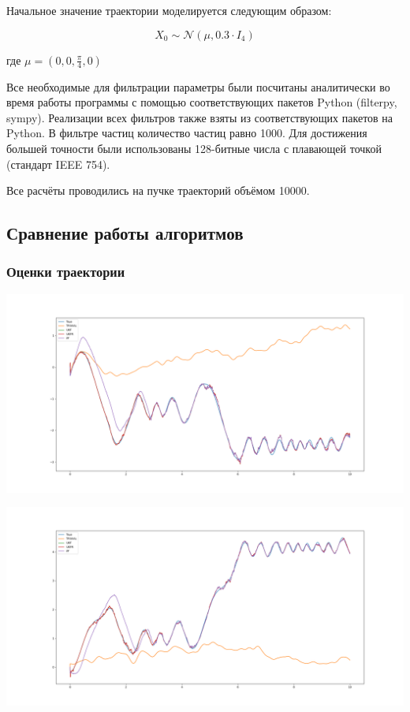 \documentclass[12pt]{article}
\begin{document}
Начальное значение траектории моделируется следующим образом:

\[
	X_0 \sim \mathcal{N}(\mu, 0.3 \cdot I_4)
\]

где $\mu = (0, 0, \frac{\pi}{4}, 0)$

Все необходимые для фильтрации параметры были посчитаны аналитически во время работы программы с помощью соответствующих пакетов Python (filterpy, sympy). Реализации всех фильтров также взяты из соответствующих пакетов на Python. В фильтре частиц количество частиц равно 1000. Для достижения большей точности были использованы 128-битные числа с плавающей точкой (стандарт IEEE 754).

Все расчёты проводились на пучке траекторий объёмом 10000.

\subsection{Сравнение работы алгоритмов}
\begin{landscape}
	\subsubsection{Оценки траектории}
	\includegraphics[width=1.0\linewidth]{example/estimate_0.png}\newpage
\end{landscape}

\begin{landscape}
	\includegraphics[width=1.0\linewidth]{example/estimate_1.png}\newpage
\end{landscape}
\end{document}
